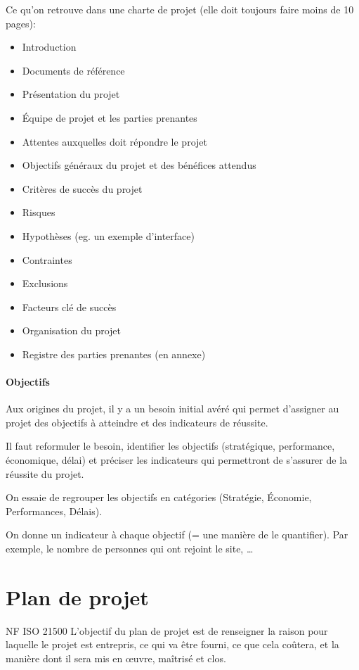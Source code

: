 \documentclass[10pt,a4paper,french]{article}
\begin{document}
Ce qu'on retrouve dans une charte de projet (elle doit toujours faire moins de 10 pages):
\begin{itemize}
\item Introduction
\item Documents de référence
\item Présentation du projet
\item Équipe de projet et les parties prenantes
\item Attentes auxquelles doit répondre le projet
\item Objectifs généraux du projet et des bénéfices attendus
\item Critères de succès du projet
\item Risques
\item Hypothèses (eg. un exemple d'interface)
\item Contraintes
\item Exclusions
\item Facteurs clé de succès
\item Organisation du projet
\item Registre des parties prenantes (en annexe)
\end{itemize}

\subsection{Objectifs}

\begin{cquote}{}
Aux origines du projet, il y a un besoin initial avéré qui permet d'assigner au projet des objectifs à atteindre et des indicateurs de réussite.
\end{cquote}

Il faut reformuler le besoin, identifier les objectifs (stratégique, performance, économique, délai) et préciser les indicateurs qui permettront de s'assurer de la réussite du projet.

On essaie de regrouper les objectifs en catégories (Stratégie, Économie, Performances, Délais).

On donne un indicateur à chaque objectif (= une manière de le quantifier). Par exemple, le nombre de personnes qui ont rejoint le site, \ldots

\part{Plan de projet}

\begin{cquote}{NF ISO 21500}
L'objectif du plan de projet est de renseigner la raison pour laquelle le projet est entrepris, ce qui va être fourni, ce que cela coûtera, et la manière dont il sera mis en œuvre, maîtrisé et clos.
\end{cquote}
\end{document}
